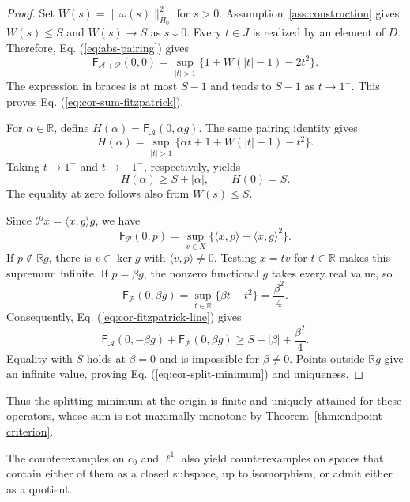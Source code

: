 \documentclass[11pt]{article}
\newcommand{\R}{\mathbb R}
\newcommand{\pair}[2]{\langle #1,#2\rangle}
\theoremstyle{definition}
\theoremstyle{remark}
\begin{document}
\begin{proof}
Set $W(s)=\|\omega(s)\|_{H_0}^2$ for $s>0$. Assumption~\ref{ass:construction} gives $W(s)\le S$ and $W(s)\to S$ as $s\downarrow0$. Every $t\in J$ is realized by an element of $D$. Therefore, Eq. (\ref{eq:abs-pairing}) gives
\[
\mathsf F_{\mathcal A+\mathcal P}(0,0)
=\sup_{|t|>1}\{1+W(|t|-1)-2t^2\}.
\]
The expression in braces is at most $S-1$ and tends to $S-1$ as $t\to1^+$. This proves Eq. (\ref{eq:cor-sum-fitzpatrick}).

For $\alpha\in\R$, define $H(\alpha)=\mathsf F_{\mathcal A}(0,\alpha g)$. The same pairing identity gives
\[
H(\alpha)=\sup_{|t|>1}
\{\alpha t+1+W(|t|-1)-t^2\}.
\]
Taking $t\to1^+$ and $t\to-1^-$, respectively, yields
\begin{equation}
H(\alpha)\ge S+|\alpha|,
\qquad H(0)=S.
\label{eq:cor-fitzpatrick-line}
\end{equation}
The equality at zero follows also from $W(s)\le S$.

Since $\mathcal P x=\pair{x}{g}g$, we have
\[
\mathsf F_{\mathcal P}(0,p)
=\sup_{x\in X}\{\pair{x}{p}-\pair{x}{g}^2\}.
\]
If $p\notin\R g$, there is $v\in\ker g$ with $\pair{v}{p}\ne0$. Testing $x=tv$ for $t\in\R$ makes this supremum infinite. If $p=\beta g$, the nonzero functional $g$ takes every real value, so
\[
\mathsf F_{\mathcal P}(0,\beta g)
=\sup_{t\in\R}\{\beta t-t^2\}
=\frac{\beta^2}{4}.
\]
Consequently, Eq. (\ref{eq:cor-fitzpatrick-line}) gives
\[
\mathsf F_{\mathcal A}(0,-\beta g)
+\mathsf F_{\mathcal P}(0,\beta g)
\ge S+|\beta|+\frac{\beta^2}{4}.
\]
Equality with $S$ holds at $\beta=0$ and is impossible for $\beta\ne0$. Points outside $\R g$ give an infinite value, proving Eq. (\ref{eq:cor-split-minimum}) and uniqueness.
\end{proof}

Thus the splitting minimum at the origin is finite and uniquely attained for these operators, whose sum is not maximally monotone by Theorem~\ref{thm:endpoint-criterion}.

The counterexamples on $c_0$ and $\ell^1$ also yield counterexamples on spaces that contain either of them as a closed subspace, up to isomorphism, or admit either as a quotient.
\end{document}
